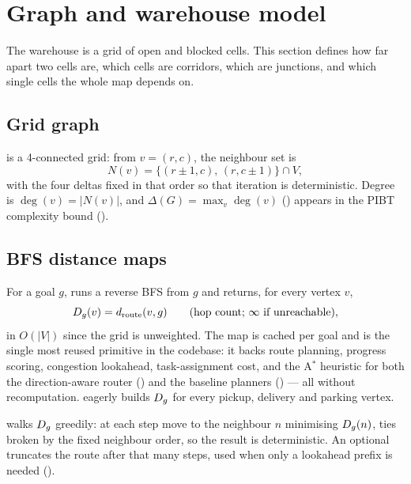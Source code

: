 \section{Graph and warehouse model}
\label{sec:graph}

\begin{lede}
The warehouse is a grid of open and blocked cells. This section defines how far
apart two cells are, which cells are corridors, which are junctions, and which
single cells the whole map depends on.
\end{lede}

\subsection{Grid graph}
\label{sec:graph-grid}

 is a 4-connected grid: from $v = (r, c)$, the neighbour set is
\begin{equation}
  N(v) = \{(r \pm 1, c),\, (r, c \pm 1)\} \cap V,
\end{equation}
with the four deltas fixed in that order so that iteration is deterministic.
Degree is $\deg(v) = |N(v)|$, and $\Delta(G) = \max_v \deg(v)$
() appears in the PIBT complexity bound
().

\subsection{BFS distance maps}
\label{sec:graph-distances}

For a goal $g$,  runs a reverse BFS from
$g$ and returns, for every vertex $v$,
\begin{equation}
  D_{g}(v) = d_{\mathrm{route}}(v, g)
  \qquad \text{(hop count; } \infty \text{ if unreachable)},
\end{equation}
in $O(|V|)$ since the grid is unweighted. The map is cached per goal and is
the single most reused primitive in the codebase: it backs route planning,
progress scoring, congestion lookahead, task-assignment cost, and the
A$^\ast$ heuristic for both the direction-aware router () and
the baseline planners () --- all without recomputation.
 eagerly builds $D_{g}$ for every pickup,
delivery and parking vertex.

 walks $D_{g}$ greedily: at each
step move to the neighbour $n$ minimising $D_{g}(n)$, ties broken by the fixed
neighbour order, so the result is deterministic. An optional 
truncates the route after that many steps, used when only a lookahead prefix is
needed ().

